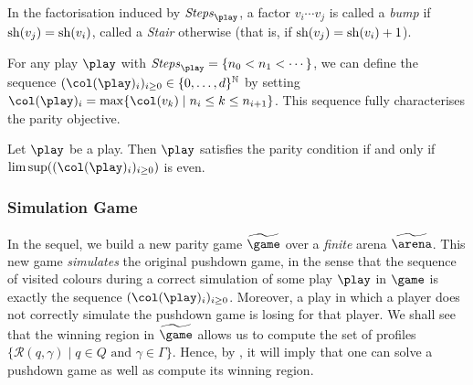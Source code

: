 In the factorisation induced by $\Stepsg{\play}$, a factor $v_i\cdots v_j$ is called a
\emph{bump} if $\mathrm{sh}(v_j)=\mathrm{sh}(v_i)$, called a \emph{Stair} otherwise (that is, if $\mathrm{sh}(v_j)=\mathrm{sh}(v_i)+1$).

For any play $\play$ with $\Stepsg{\play}=\{n_0<n_1<\cdots\}$, we can define the sequence $(\pdscol{\play}_i)_{i\geq
0}\in\{0,\dots,d\}^{\mathbb{N}}$ by setting $\pdscol{\play}_i=\max\{\pdscol{v_k}\mid n_i\leq k\leq n_{i+1}\}$.
This sequence fully characterises the parity objective.

\begin{proposition}\label{11-prop:trans_cond}
Let $\play$ be a play. Then $\play$ satisfies the parity condition  if and only if $\limsup((\pdscol{\play}_i)_{i\geq 0})$ is even.
\end{proposition}

\subsubsection{Simulation Game}

In the sequel, we build a new parity game $\fgame$ over a \emph{finite} arena $\farena$.
This new game
\emph{simulates} the original pushdown game, in the sense that the
sequence of visited colours during a correct simulation of some play $\play$ in $\game$ is
exactly the sequence $(\pdscol{\play}_i)_{i\geq 0}$. Moreover, a play in which
a player does not correctly simulate the pushdown game is losing
for that player. We shall see that the winning region in $\fgame$ allows us to compute the set of profiles $\{\mathcal{R}(q,\gamma) \mid q\in Q \text{ and } \gamma\in\Gamma\}$. Hence, by , it will imply that one can solve a pushdown game as well as compute its winning region.



